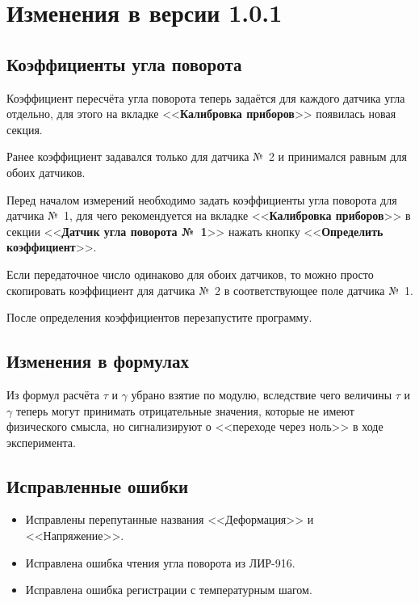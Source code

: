 \documentclass[12pt, a4paper]{article}
\newcommand{\CTRL}[1]{<<{\bf #1}>>}
\begin{document}
\section*{Изменения в версии 1.0.1}

\subsection*{Коэффициенты угла поворота}

Коэффициент пересчёта угла поворота теперь задаётся для каждого датчика угла отдельно, для этого на вкладке \CTRL{Калибровка приборов} появилась новая секция.

Ранее коэффициент задавался только для датчика №~2 и принимался равным для обоих датчиков.

Перед началом измерений необходимо задать коэффициенты угла поворота для датчика №~1, для чего рекомендуется на вкладке \CTRL{Калибровка приборов} в секции \CTRL{Датчик угла поворота №~1} нажать кнопку \CTRL{Определить коэффициент}.

Если передаточное число одинаково для обоих датчиков, то можно просто скопировать коэффициент для датчика №~2 в соответствующее поле датчика №~1.

После определения коэффициентов перезапустите программу.

\subsection*{Изменения в формулах}

Из формул расчёта $\tau$ и $\gamma$ убрано взятие по модулю, вследствие чего величины $\tau$ и $\gamma$ теперь могут принимать отрицательные значения, которые не имеют физического смысла, но сигнализируют о <<переходе через ноль>> в ходе эксперимента.

\subsection*{Исправленные ошибки}

\begin{itemize}
\item Исправлены перепутанные названия <<Деформация>> и <<Напряжение>>.
\item Исправлена ошибка чтения угла поворота из ЛИР-916.
\item Исправлена ошибка регистрации с температурным шагом.
\end{itemize}
\end{document}
